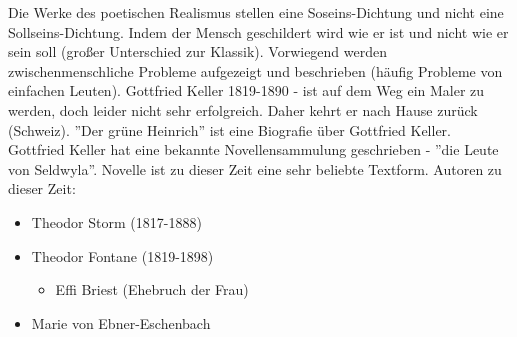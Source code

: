 \documentclass[a4paper]{report}
\begin{document}
Die Werke des poetischen Realismus stellen eine Soseins-Dichtung und nicht eine Sollseins-Dichtung. Indem der Mensch geschildert wird wie er ist und nicht wie er sein soll (großer Unterschied zur Klassik). Vorwiegend werden zwischenmenschliche Probleme aufgezeigt und beschrieben (häufig Probleme von einfachen Leuten).
\newline
\newline
Gottfried Keller 1819-1890 - ist auf dem Weg ein Maler zu werden, doch leider nicht sehr erfolgreich. Daher kehrt er  nach Hause zurück (Schweiz). ''Der grüne Heinrich'' ist eine Biografie über Gottfried Keller. Gottfried Keller hat eine bekannte Novellensammulung geschrieben - ''die Leute von Seldwyla''.
\newline
\newline
Novelle ist zu dieser Zeit eine sehr beliebte Textform.
\newline
\newline
Autoren zu dieser Zeit:
\begin{itemize}
\item Theodor Storm (1817-1888)
\item Theodor Fontane (1819-1898)
	\begin{itemize}
	\item Effi Briest (Ehebruch der Frau)
	\end{itemize}
\item Marie von Ebner-Eschenbach
\end{itemize}
\end{document}
